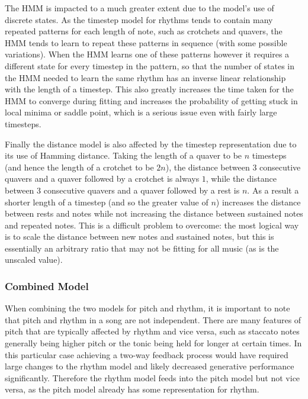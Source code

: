 \documentclass[ author={Stephen Livermore-Tozer},
				supervisor={Dr. Peter Flach},
				degree={MEng},
				title={Algorithmic Co-composition Using Machine Learning},
				subtitle={},
				type={research},
				year={2016} ]{dissertation}
\begin{document}
	The HMM is impacted to a much greater extent due to the model's use of discrete states. As the timestep model for rhythms tends to contain many repeated patterns for each length of note, such as crotchets and quavers, the HMM tends to learn to repeat these patterns in sequence (with some possible variations). When the HMM learns one of these patterns however it requires a different state for every timestep in the pattern, so that the number of states in the HMM needed to learn the same rhythm has an inverse linear relationship with the length of a timestep. This also greatly increases the time taken for the HMM to converge during fitting and increases the probability of getting stuck in local minima or saddle point, which is a serious issue even with fairly large timesteps. 
	
	Finally the distance model is also affected by the timestep representation due to its use of Hamming distance. Taking the length of a quaver to be $n$ timesteps (and hence the length of a crotchet to be $2n$), the distance between 3 consecutive quavers and a quaver followed by a crotchet is always $1$, while the distance between 3 consecutive quavers and a quaver followed by a rest is $n$. As a result a shorter length of a timestep (and so the greater value of $n$) increases the distance between rests and notes while not increasing the distance between sustained notes and repeated notes. This is a difficult problem to overcome: the most logical way is to scale the distance between new notes and sustained notes, but this is essentially an arbitrary ratio that may not be fitting for all music (as is the unscaled value). 
	
	\subsubsection{Combined Model}
	
	When combining the two models for pitch and rhythm, it is important to note that pitch and rhythm in a song are not independent. There are many features of pitch that are typically affected by rhythm and vice versa, such as staccato notes generally being higher pitch or the tonic being held for longer at certain times. In this particular case achieving a two-way feedback process would have required large changes to the rhythm model and likely decreased generative performance significantly. Therefore the rhythm model feeds into the pitch model but not vice versa, as the pitch model already has some representation for rhythm.
	
\end{document}
